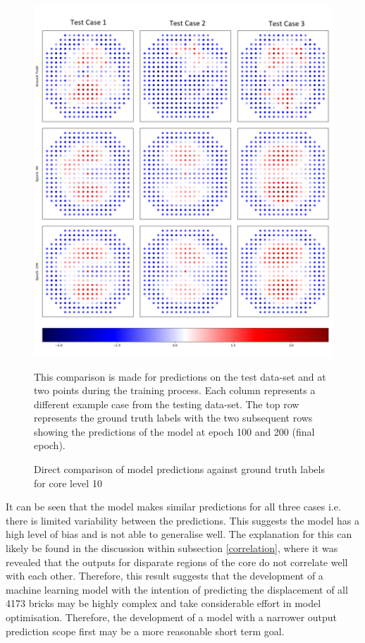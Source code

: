 \begin{figure}[p]
	\centering
	\includegraphics[scale=0.45]{Figures/preds_layer_10.png}
	\caption{Direct comparison of model predictions against ground truth labels for core level 10} {This comparison is made for predictions on the test data-set and at two points during the training process. Each column represents a different example case from the testing data-set. The top row represents the ground truth labels with the two subsequent rows showing the predictions of the model at epoch 100 and 200 (final epoch). }
	\label{fig:preds_layer_10}
\end{figure}

\noindent
It can be seen that the model makes similar predictions for all three cases i.e. there is limited variability between the predictions. This suggests the model has a high level of bias and is not able to generalise well. The explanation for this can likely be found in the discussion within subsection \ref{correlation}, where it was revealed that the outputs for disparate regions of the core do not correlate well with each other. Therefore, this result suggests that the development of a machine learning model with the intention of predicting the displacement of all 4173 bricks may be highly complex and take considerable effort in model optimisation. Therefore, the development of a model with a narrower output prediction scope first may be a more reasonable short term goal.
